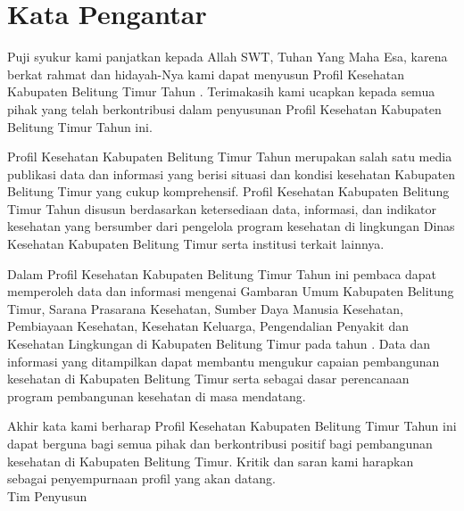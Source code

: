 {}

\section*{Kata Pengantar}
Puji syukur kami panjatkan kepada Allah SWT, Tuhan Yang Maha Esa,
karena berkat rahmat dan hidayah-Nya kami dapat menyusun Profil Kesehatan
Kabupaten Belitung Timur Tahun \tPnos{}. Terimakasih kami ucapkan kepada semua pihak
yang telah berkontribusi dalam penyusunan Profil Kesehatan Kabupaten
Belitung Timur Tahun \tPnos{} ini.

Profil Kesehatan Kabupaten Belitung Timur Tahun \tPnos{} merupakan salah
satu media publikasi data dan informasi yang berisi situasi dan kondisi
kesehatan Kabupaten Belitung Timur yang cukup komprehensif. Profil
Kesehatan Kabupaten Belitung Timur Tahun \tPnos{} disusun berdasarkan
ketersediaan data, informasi, dan indikator kesehatan yang bersumber
dari pengelola program kesehatan di lingkungan Dinas Kesehatan Kabupaten Belitung Timur serta institusi
terkait lainnya.

Dalam Profil Kesehatan Kabupaten Belitung Timur Tahun \tPnos{} ini pembaca
dapat memperoleh data dan informasi mengenai Gambaran Umum Kabupaten
Belitung Timur, Sarana Prasarana Kesehatan, Sumber Daya Manusia Kesehatan,
Pembiayaan Kesehatan, Kesehatan Keluarga, Pengendalian Penyakit dan Kesehatan Lingkungan di Kabupaten Belitung Timur pada tahun
\tPnos{}. Data dan informasi yang ditampilkan dapat membantu mengukur
capaian pembangunan kesehatan di Kabupaten Belitung Timur serta sebagai
dasar perencanaan program pembangunan kesehatan di masa mendatang.

Akhir kata kami berharap Profil Kesehatan Kabupaten Belitung Timur
Tahun \tPnos{} ini dapat berguna bagi semua pihak dan berkontribusi positif
bagi pembangunan kesehatan di Kabupaten Belitung Timur. Kritik dan
saran kami harapkan sebagai penyempurnaan profil yang akan datang.\\

\vspace*{4ex}
\noindent Tim Penyusun 